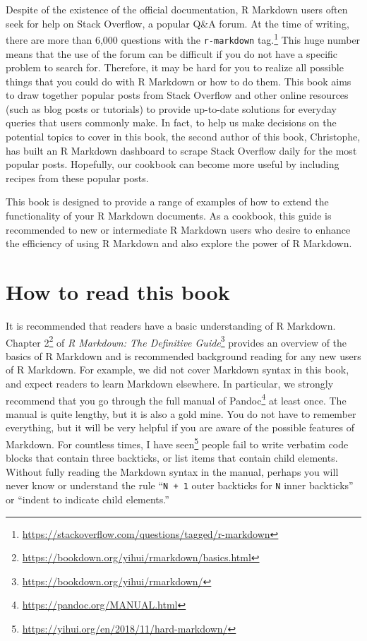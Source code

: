 \documentclass[
  11pt,
]{krantz}
\renewcommand{\href}[2]{#2\footnote{\url{#1}}}
\begin{document}
Despite of the existence of the official documentation, R Markdown users often seek for help on Stack Overflow, a popular Q\&A forum. At the time of writing, there are more than 6,000 questions with \href{https://stackoverflow.com/questions/tagged/r-markdown}{the \texttt{r-markdown} tag.} This huge number means that the use of the forum can be difficult if you do not have a specific problem to search for. Therefore, it may be hard for you to realize all possible things that you could do with R Markdown or how to do them. This book aims to draw together popular posts from Stack Overflow and other online resources (such as blog posts or tutorials) to provide up-to-date solutions for everyday queries that users commonly make. In fact, to help us make decisions on the potential topics to cover in this book, the second author of this book, Christophe, has built an R Markdown dashboard to scrape Stack Overflow daily for the most popular posts. Hopefully, our cookbook can become more useful by including recipes from these popular posts.

This book is designed to provide a range of examples of how to extend the functionality of your R Markdown documents. As a cookbook, this guide is recommended to new or intermediate R Markdown users who desire to enhance the efficiency of using R Markdown and also explore the power of R Markdown.

\hypertarget{how-to-read-this-book}{%
\section*{How to read this book}\label{how-to-read-this-book}}


It is recommended that readers have a basic understanding of R Markdown. \href{https://bookdown.org/yihui/rmarkdown/basics.html}{Chapter 2} of \href{https://bookdown.org/yihui/rmarkdown/}{\emph{R Markdown: The Definitive Guide}} \citep{rmarkdown2018} provides an overview of the basics of R Markdown and is recommended background reading for any new users of R Markdown. For example, we did not cover Markdown syntax in this book, and expect readers to learn Markdown elsewhere. In particular, we strongly recommend that you go through \href{https://pandoc.org/MANUAL.html}{the full manual of Pandoc} at least once. The manual is quite lengthy, but it is also a gold mine. You do not have to remember everything, but it will be very helpful if you are aware of the possible features of Markdown. \href{https://yihui.org/en/2018/11/hard-markdown/}{For countless times, I have seen} people fail to write verbatim code blocks that contain three backticks, or list items that contain child elements. Without fully reading the Markdown syntax in the manual, perhaps you will never know or understand the rule ``\texttt{N\ +\ 1} outer backticks for \texttt{N} inner backticks'' or ``indent to indicate child elements.''
\end{document}
